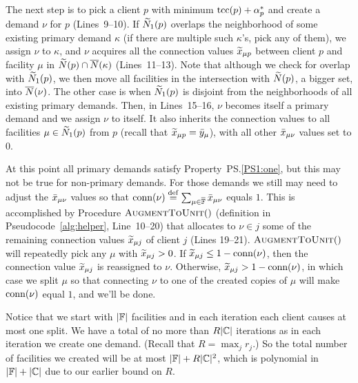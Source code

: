 \documentclass[11pt]{article}
\begin{document}


The next step is to pick a client $p$ with minimum
$\textrm{tcc}(p)+\alpha_p^\ast$ and create a demand $\nu$ for $p$
(Lines~9--10). If ${\widetilde N}_1(p)$ overlaps the neighborhood
of some existing primary demand $\kappa$ (if there are
multiple such $\kappa$'s, pick any of them), we assign $\nu$
to $\kappa$, and $\nu$ acquires all the connection values
${\widetilde x}_{\mu p}$ between client $p$ and facility $\mu$ in
${\widetilde N}(p)\cap {\overline{N}}(\kappa)$ (Lines~11--13). Note that
although we check for overlap with ${\widetilde N}_1(p)$, we then
move all facilities in the intersection with ${\widetilde N}(p)$,
a bigger set, into ${\overline{N}}(\nu)$.  The other case is when
${\widetilde N}_1(p)$ is disjoint from the neighborhoods of all
existing primary demands. Then, in Lines~15--16, $\nu$
becomes itself a primary demand and we assign $\nu$ to
itself. It also inherits the connection values to all
facilities $\mu\in{\widetilde N}_1(p)$ from $p$ (recall that
${\widetilde x}_{\mu p} = {\bar y}_{\mu}$), with all other
${\bar x}_{\mu\nu}$ values set to $0$.

At this point all primary demands satisfy
Property~PS.\ref{PS1:one}, but this may not be true for
non-primary demands. For those demands we still may need to
adjust the ${\bar x}_{\mu\nu}$ values so that ${\textrm{conn}}(\nu)
\stackrel{\mathrm{def}}{=}
\sum_{\mu\in\overline{\mathbb{F}}}{\bar x}_{\mu \nu}$ equals $1$. This
is accomplished by Procedure ${\textsc{AugmentToUnit}}()$ (definition
in Pseudocode~\ref{alg:helper}, Line~10--20) that allocates
to $\nu\in j$ some of the remaining connection values
${\widetilde x}_{\mu j}$ of client $j$ (Lines 19--21).
${\textsc{AugmentToUnit}}()$ will repeatedly pick any $\mu$ with
${\widetilde x}_{\mu j} >0$.  If ${\widetilde x}_{\mu j} \leq
1-{\textrm{conn}}(\nu)$, then the connection value ${\widetilde x}_{\mu
  j}$ is reassigned to $\nu$. Otherwise, ${\widetilde x}_{\mu j} >
1-{\textrm{conn}}(\nu)$, in which case we split $\mu$ so that
connecting $\nu$ to one of the created copies of $\mu$ will
make ${\textrm{conn}}(\nu)$ equal $1$, and we'll be done.

\smallskip

Notice that we start with $|\mathbb{F}|$ facilities and in each
iteration each client causes at most one split. We have a total of no more
than $R|\mathbb{C}|$ iterations as in each iteration we create
one demand. (Recall that $R = \max_jr_j$.)
So the total number of facilities we created
will be at most $|\mathbb{F}|+ R|\mathbb{C}|^2$, which is
polynomial in $|\mathbb{F}|+|\mathbb{C}|$ due to our earlier bound on $R$.

\end{document}
